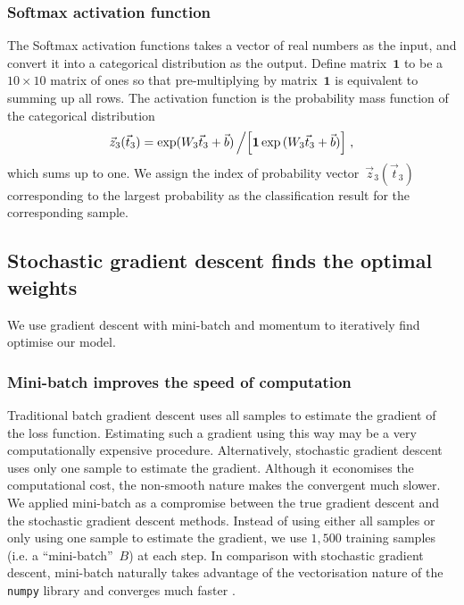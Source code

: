 \subsubsection{Softmax activation function}
The Softmax activation functions takes a vector of real numbers as the input, and convert it into a categorical distribution as the output. Define matrix~$\mathbf 1$ to be a $10\times 10$ matrix of ones so that pre-multiplying by matrix~$\mathbf 1$ is equivalent to summing up all rows. The activation function is the probability mass function of the categorical distribution
\begin{equation}
     \vec z_{3}(\vec t_3)={\exp(W_3 \vec t_{3}+\vec b)}\left/\left[{\mathbf 1\exp{(W_3 \vec t_{3}+\vec b)}}\right]\right.,
\end{equation}
which sums up to one. We assign the index of probability vector~$\vec z_{3}(\vec t_3)$ corresponding to the largest probability as the classification result for the corresponding sample.

\subsection{Stochastic gradient descent finds the optimal weights}
We use gradient descent with mini-batch and momentum to iteratively find optimise our model.
\subsubsection{Mini-batch improves the speed of computation \label{sec:minibatch}}
Traditional batch gradient descent uses all samples to estimate the gradient of the loss function. Estimating such a gradient using this way may be a very computationally expensive procedure. Alternatively, stochastic gradient descent uses only one sample to estimate the gradient. Although it economises the computational cost, the non-smooth nature makes the convergent much slower. 
We applied mini-batch as a compromise between the true gradient descent and the stochastic gradient descent methods. 
Instead of using either all samples or only using one sample to estimate the gradient, we use $1,500$ training samples (i.e. a ``mini-batch''~$B$) at each step. 
In comparison with stochastic gradient descent, mini-batch naturally takes advantage of the vectorisation nature of the \texttt{numpy} library and converges much faster \citep{DBLP:journals/corr/GoyalDGNWKTJH17}.

